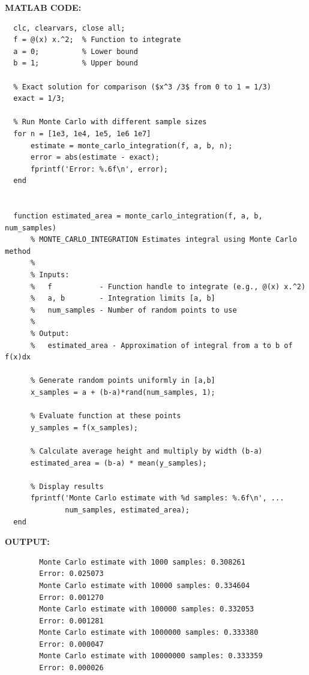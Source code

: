 \documentclass[12pt]{report}
\begin{document}
  \vspace{0.5cm}
  \noindent \textbf{MATLAB CODE:}
  \begin{lstlisting}
  clc, clearvars, close all;
  f = @(x) x.^2;  % Function to integrate
  a = 0;          % Lower bound
  b = 1;          % Upper bound

  % Exact solution for comparison ($x^3 /3$ from 0 to 1 = 1/3)
  exact = 1/3; 

  % Run Monte Carlo with different sample sizes
  for n = [1e3, 1e4, 1e5, 1e6 1e7]
      estimate = monte_carlo_integration(f, a, b, n);
      error = abs(estimate - exact);
      fprintf('Error: %.6f\n', error);
  end


  function estimated_area = monte_carlo_integration(f, a, b, num_samples)
      % MONTE_CARLO_INTEGRATION Estimates integral using Monte Carlo method
      %
      % Inputs:
      %   f           - Function handle to integrate (e.g., @(x) x.^2)
      %   a, b        - Integration limits [a, b]
      %   num_samples - Number of random points to use
      %
      % Output:
      %   estimated_area - Approximation of integral from a to b of f(x)dx

      % Generate random points uniformly in [a,b]
      x_samples = a + (b-a)*rand(num_samples, 1);
      
      % Evaluate function at these points
      y_samples = f(x_samples);
      
      % Calculate average height and multiply by width (b-a)
      estimated_area = (b-a) * mean(y_samples);
      
      % Display results
      fprintf('Monte Carlo estimate with %d samples: %.6f\n', ...
              num_samples, estimated_area);
  end
  \end{lstlisting}

  \vspace{0.5cm}
  \textbf{OUTPUT:} 
  \begin{verbatim}
        Monte Carlo estimate with 1000 samples: 0.308261
        Error: 0.025073
        Monte Carlo estimate with 10000 samples: 0.334604
        Error: 0.001270
        Monte Carlo estimate with 100000 samples: 0.332053
        Error: 0.001281
        Monte Carlo estimate with 1000000 samples: 0.333380
        Error: 0.000047
        Monte Carlo estimate with 10000000 samples: 0.333359
        Error: 0.000026
  \end{verbatim}
\end{document}
